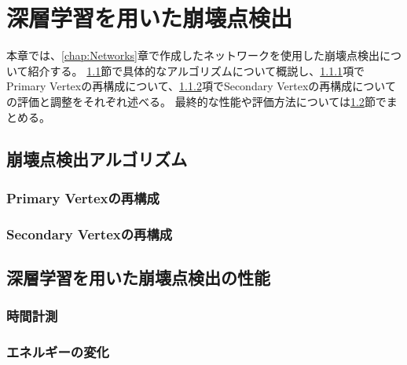 
\chapter{深層学習を用いた崩壊点検出} \label{chap:VertexFinderwithDL}

本章では、\ref{chap:Networks}章で作成したネットワークを使用した崩壊点検出について紹介する。
\ref{VFDL:AlgorithmforVFDL}節で具体的なアルゴリズムについて概説し、\ref{VFDL:AlgoVFDL:ReconstructionofPrimaryVertex}項でPrimary Vertexの再構成について、\ref{VFDL:AlgoVFDL:ReconstructionofSecondaryVertex}項でSecondary Vertexの再構成についての評価と調整をそれぞれ述べる。
最終的な性能や評価方法については\ref{VFDL:PerformanceofVFDL}節でまとめる。


\section{崩壊点検出アルゴリズム} \label{VFDL:AlgorithmforVFDL}

\subsection{Primary Vertexの再構成} \label{VFDL:AlgoVFDL:ReconstructionofPrimaryVertex}

\subsection{Secondary Vertexの再構成} \label{VFDL:AlgoVFDL:ReconstructionofSecondaryVertex}

\section{深層学習を用いた崩壊点検出の性能} \label{VFDL:PerformanceofVFDL}

\subsection{時間計測} \label{VFDL:PerfVFDL:Time}

\subsection{エネルギーの変化} \label{VFDL:PerfVFDL:Energy}

